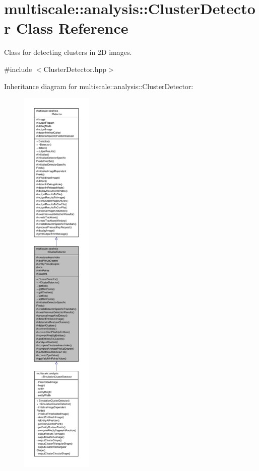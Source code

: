 \hypertarget{classmultiscale_1_1analysis_1_1ClusterDetector}{\section{multiscale\-:\-:analysis\-:\-:Cluster\-Detector Class Reference}
\label{classmultiscale_1_1analysis_1_1ClusterDetector}
}


Class for detecting clusters in 2\-D images.  




{\ttfamily \#include $<$Cluster\-Detector.\-hpp$>$}



Inheritance diagram for multiscale\-:\-:analysis\-:\-:Cluster\-Detector\-:\nopagebreak
\begin{figure}[H]
\begin{center}
\leavevmode
\includegraphics[height=550pt]{classmultiscale_1_1analysis_1_1ClusterDetector__inherit__graph}
\end{center}
\end{figure}


